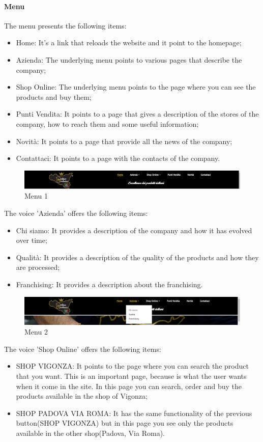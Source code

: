 \paragraph{Menu}
The menu presents the following items: 
\begin{itemize}
	\item Home: It's a link that reloads the website and it point to the homepage;
	\item Azienda: The underlying menu points to various pages that describe the company;
	\item Shop Online: The underlying menu points to the page where you can see the products and buy them;
	\item Punti Vendita: It points to a page that gives a description of the stores of the company, how to reach them and some useful information;
	\item Novità: It points to a page that provide all the news of the company;
	\item Contattaci: It points to a page with the contacts of the company.
\end{itemize}

\begin{figure}[H]
	\centering\includegraphics[width=12cm]{Img/menu.png}
	\caption{Menu 1}
\end{figure}

The voice 'Azienda' offers the following items:
\begin{itemize}
	\item Chi siamo: It provides a description of the company and how it has evolved over time;
	\item Qualità: It provides a description of the quality of the products and how they are processed;
	\item Franchising: It provides a description about the franchising.
\end{itemize}

\begin{figure}[H]
	\centering\includegraphics[width=12cm]{Img/menu2.png}
	\caption{Menu 2}
\end{figure}

The voice 'Shop Online' offers the following items:
\begin{itemize}
	\item SHOP VIGONZA: It points to the page where you can search the product that you want. This is an important page, because is what the user wants when it come in the site. In this page you can search, order and buy the products available in the shop of Vigonza;
	\item SHOP PADOVA VIA ROMA: It has the same functionality of the previous button(SHOP VIGONZA) but in this page you see only the products available in the other shop(Padova, Via Roma).
\end{itemize}

